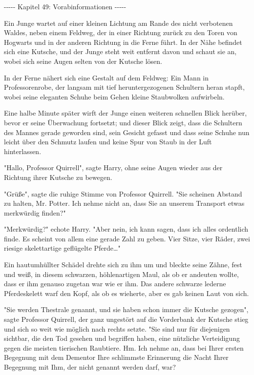 

\hypertarget{vorabinformationen}{%

-\/-\/-\/-\/- Kapitel 49: Vorabinformationen -\/-\/-\/-\/-

Ein Junge wartet auf einer kleinen Lichtung am Rande des nicht verbotenen Waldes, neben einem Feldweg, der in einer Richtung zurück zu den Toren von Hogwarts und in der anderen Richtung in die Ferne führt. In der Nähe befindet sich eine Kutsche, und der Junge steht weit entfernt davon und schaut sie an, wobei sich seine Augen selten von der Kutsche lösen.

In der Ferne nähert sich eine Gestalt auf dem Feldweg: Ein Mann in Professorenrobe, der langsam mit tief heruntergezogenen Schultern heran stapft, wobei seine eleganten Schuhe beim Gehen kleine Staubwolken aufwirbeln.

Eine halbe Minute später wirft der Junge einen weiteren schnellen Blick herüber, bevor er seine Überwachung fortsetzt; und dieser Blick zeigt, dass die Schultern des Mannes gerade geworden sind, sein Gesicht gefasst und dass seine Schuhe nun leicht über den Schmutz laufen und keine Spur von Staub in der Luft hinterlassen.

"Hallo, Professor Quirrell", sagte Harry, ohne seine Augen wieder aus der Richtung ihrer Kutsche zu bewegen.

"Grüße", sagte die ruhige Stimme von Professor Quirrell. "Sie scheinen Abstand zu halten, Mr. Potter. Ich nehme nicht an, dass Sie an unserem Transport etwas merkwürdig finden?"

"Merkwürdig?" echote Harry. "Aber nein, ich kann sagen, dass ich alles ordentlich finde. Es scheint von allem eine gerade Zahl zu geben. Vier Sitze, vier Räder, zwei riesige skelettartige geflügelte Pferde…"

Ein hautumhüllter Schädel drehte sich zu ihm um und bleckte seine Zähne, fest und weiß, in diesem schwarzen, höhlenartigen Maul, als ob er andeuten wollte, dass er ihm genauso zugetan war wie er ihm. Das andere schwarze lederne Pferdeskelett warf den Kopf, als ob es wieherte, aber es gab keinen Laut von sich.

"Sie werden Thestrale genannt, und sie haben schon immer die Kutsche gezogen", sagte Professor Quirrell, der ganz ungestört auf die Vorderbank der Kutsche stieg und sich so weit wie möglich nach rechts setzte. "Sie sind nur für diejenigen sichtbar, die den Tod gesehen und begriffen haben, eine nützliche Verteidigung gegen die meisten tierischen Raubtiere. Hm. Ich nehme an, dass bei Ihrer ersten Begegnung mit dem Dementor Ihre schlimmste Erinnerung die Nacht Ihrer Begegnung mit Ihm, der nicht genannt werden darf, war?

}
